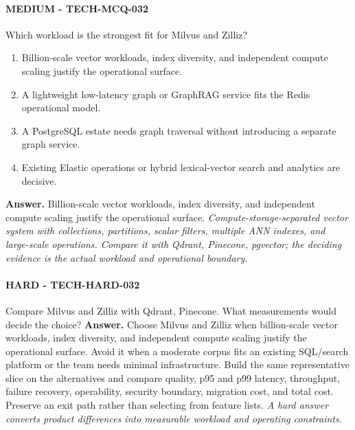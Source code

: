 \paragraph{MEDIUM - TECH-MCQ-032} Which workload is the strongest fit for Milvus and Zilliz?
\begin{enumerate}[label=\Alph*.]
\item Billion-scale vector workloads, index diversity, and independent compute scaling justify the operational surface.
\item A lightweight low-latency graph or GraphRAG service fits the Redis operational model.
\item A PostgreSQL estate needs graph traversal without introducing a separate graph service.
\item Existing Elastic operations or hybrid lexical-vector search and analytics are decisive.
\end{enumerate}
\textbf{Answer.} Billion-scale vector workloads, index diversity, and independent compute scaling justify the operational surface.
\textit{Compute-storage-separated vector system with collections, partitions, scalar filters, multiple ANN indexes, and large-scale operations. Compare it with Qdrant, Pinecone, pgvector; the deciding evidence is the actual workload and operational boundary.}
\paragraph{HARD - TECH-HARD-032} Compare Milvus and Zilliz with Qdrant, Pinecone. What measurements would decide the choice?
\textbf{Answer.} Choose Milvus and Zilliz when billion-scale vector workloads, index diversity, and independent compute scaling justify the operational surface. Avoid it when a moderate corpus fits an existing SQL/search platform or the team needs minimal infrastructure. Build the same representative slice on the alternatives and compare quality, p95 and p99 latency, throughput, failure recovery, operability, security boundary, migration cost, and total cost. Preserve an exit path rather than selecting from feature lists.
\textit{A hard answer converts product differences into measurable workload and operating constraints.}
